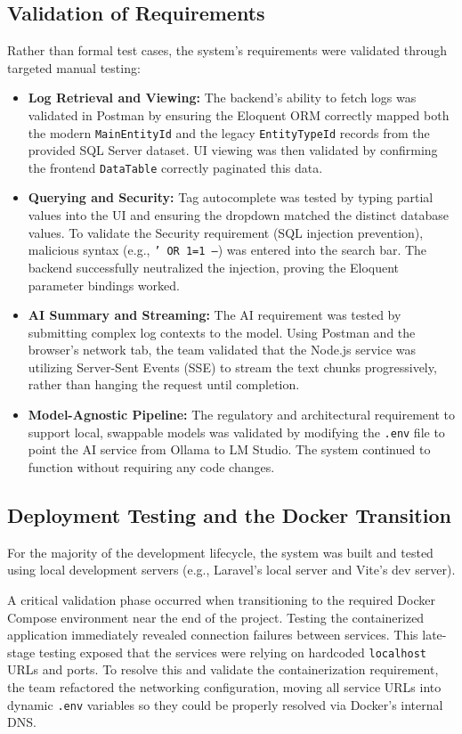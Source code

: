 \subsection{Validation of Requirements}
Rather than formal test cases, the system's requirements were validated through targeted manual testing:
\begin{itemize}
    \item \textbf{Log Retrieval and Viewing:} The backend's ability to fetch logs was validated in Postman by ensuring the Eloquent ORM correctly mapped both the modern \texttt{MainEntityId} and the legacy \texttt{EntityTypeId} records from the provided SQL Server dataset. UI viewing was then validated by confirming the frontend \texttt{DataTable} correctly paginated this data.
    \item \textbf{Querying and Security:} Tag autocomplete was tested by typing partial values into the UI and ensuring the dropdown matched the distinct database values. To validate the Security requirement (SQL injection prevention), malicious syntax (e.g., \texttt{' OR 1=1 --}) was entered into the search bar. The backend successfully neutralized the injection, proving the Eloquent parameter bindings worked.
    \item \textbf{AI Summary and Streaming:} The AI requirement was tested by submitting complex log contexts to the model. Using Postman and the browser's network tab, the team validated that the Node.js service was utilizing Server-Sent Events (SSE) to stream the text chunks progressively, rather than hanging the request until completion.
    \item \textbf{Model-Agnostic Pipeline:} The regulatory and architectural requirement to support local, swappable models was validated by modifying the \texttt{.env} file to point the AI service from Ollama to LM Studio. The system continued to function without requiring any code changes.
\end{itemize}

\subsection{Deployment Testing and the Docker Transition}
For the majority of the development lifecycle, the system was built and tested using local development servers (e.g., Laravel's local server and Vite's dev server).

A critical validation phase occurred when transitioning to the required Docker Compose environment near the end of the project. Testing the containerized application immediately revealed connection failures between services. This late-stage testing exposed that the services were relying on hardcoded \texttt{localhost} URLs and ports. To resolve this and validate the containerization requirement, the team refactored the networking configuration, moving all service URLs into dynamic \texttt{.env} variables so they could be properly resolved via Docker's internal DNS.
\pagebreak